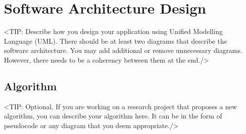 \chapter{Software Architecture Design}
\label{chap:software-architecture-design}
<TIP: Describe how you design your application using Unified Modelling
Language (UML). There should be at least two diagrams that describe the
software architecture. You may add additional or remove unnecessary diagrams.
However, there needs to be a coherency between them at the end./>

%
%
%

\section{Algorithm}
\label{section:algorithm}
<TIP: Optional, If you are working on a research project that proposes a new
algorithm, you can describe your algorithm here. It can be in the form of
pseudocode or any diagram that you deem appropriate./>